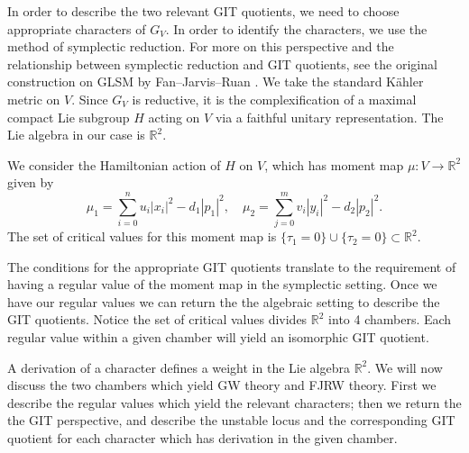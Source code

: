 \documentclass[10pt, letterpaper]{amsart}
\theoremstyle{remark}
\newcommand{\RR}{\mathbb{R}}
\newcommand{\cG}{\mathcal{G}}
\newcommand{\set}[1]{\{#1\}}
\newcommand{\nathan}[1]{\todo[color=pistachio,fancyline]{N:#1}}
\newcommand{\andrew}[1]{\todo[fancyline]{An:#1}}
\begin{document}
In order to describe the two relevant GIT quotients, we need to choose appropriate characters of $G_V$. In order to identify the characters, we use the method of symplectic reduction. For more on this perspective and the relationship between symplectic reduction and GIT quotients, see the original construction on GLSM by Fan--Jarvis--Ruan \cite{FJR15}. We take the standard K\"ahler metric on $V$. Since $G_V$ is reductive, it is the complexification of a maximal compact Lie subgroup $H$ acting on $V$ via a faithful unitary representation. The Lie algebra in our case is $\RR^2$. 

We consider the Hamiltonian action of $H$ on $V$, which has moment map $\mu:V\to \RR^2$ given by 
\[
\mu_1 = \sum_{i=0}^n u_i|x_i|^2 - d_1|p_1|^2, \quad \mu_2 = \sum_{j=0}^m v_i|y_i|^2 - d_2|p_2|^2.
\]
The set of critical values for this moment map is $\set{\tau_1=0}\cup\set{\tau_2=0}\subset \RR^2$.

The conditions for the appropriate GIT quotients translate to the requirement of having a regular value of the moment map in the symplectic setting. Once we have our regular values we can return the the algebraic setting to describe the GIT quotients.  Notice the set of critical values divides $\RR^2$ into 4 chambers. Each regular value within a given chamber will yield an isomorphic GIT quotient. 

A derivation of a character defines a weight in the Lie algebra $\RR^2$. We will now discuss the two chambers which yield GW theory and FJRW theory. First we describe the regular values which yield the relevant characters; then we return the the GIT perspective, and describe the unstable locus and the corresponding GIT quotient for each character which has derivation in the given chamber. 

\end{document}
